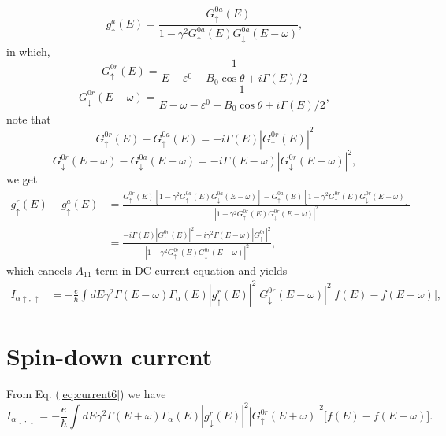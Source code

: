 \documentclass[11pt,a4paper]{article}
\begin{document}
\begin{equation}
g_{\uparrow}^{a}(E) = \frac{ G_{\uparrow}^{0a}(E)} {1-\gamma^{2} G_{\uparrow}^{0a}(E) G_{\downarrow}^{0a}(E-\omega)},
\end{equation}
in which,
\begin{equation}
G_{\uparrow}^{0 r}(E)=\frac{1}{E-\varepsilon^{0}-B_{0} \cos \theta+i \Gamma(E) / 2}
\end{equation}
\begin{equation}
G_{\downarrow}^{0 r}(E-\omega)=\frac{1}{E-\omega-\varepsilon^{0}+B_{0} \cos \theta+i \Gamma(E) / 2},
\end{equation}
note that
\begin{equation}
G_{\uparrow}^{0 r}(E) - G_{\uparrow}^{0 a}(E)=-i\Gamma(E) |G_{\uparrow}^{0 r}(E)|^{2}
\end{equation}
\begin{equation}
G_{\downarrow}^{0 r}(E-\omega) - G_{\downarrow}^{0 a}(E-\omega)=-i\Gamma(E-\omega) |G_{\downarrow}^{0 r}(E-\omega)|^{2},
\end{equation}
we get
\begin{equation}
\begin{split}
g_{\uparrow}^{r}(E) - g_{\uparrow}^{a}(E) &= \frac{G_{\uparrow}^{0r}(E)[1-\gamma^{2} G_{\uparrow}^{0a}(E) G_{\downarrow}^{0a}(E-\omega)]- G_{\uparrow}^{0a}(E)[1-\gamma^{2} G_{\uparrow}^{0r}(E) G_{\downarrow}^{0r}(E-\omega)]} {|1-\gamma^{2} G_{\uparrow}^{0r}(E) G_{\downarrow}^{0r}(E-\omega)|^{2}} \\
&=\frac{-i\Gamma(E) |G_{\uparrow}^{0 r}(E)|^{2}-i\gamma^{2}\Gamma(E-\omega) |G_{\uparrow}^{0r}|^{2}} {|1-\gamma^{2} G_{\uparrow}^{0r}(E) G_{\downarrow}^{0r}(E-\omega)|^{2}},
\end{split}
\end{equation}
which cancels $A_{11}$ term in DC current equation and yields
\begin{equation}
\begin{split}
I_{\alpha\uparrow,\uparrow}&=-\frac{e}{\hbar}\int dE \gamma^{2}\Gamma(E-\omega) \Gamma_{\alpha}(E)|g_{\uparrow}^{r}\left(E\right)|^{2} |G_{\downarrow}^{0r} (E-\omega)|^{2} \big[f(E) - f(E-\omega) \big],
\end{split}
\label{eq:current6}
\end{equation}
\section{Spin-down current}
From Eq. (\ref{eq:current6}) we have
\begin{equation}
I_{\alpha\downarrow,\downarrow}= -\frac{e}{\hbar}\int dE \gamma^{2}\Gamma(E+\omega) \Gamma_{\alpha}(E)|g_{\downarrow}^{r}\left(E\right)|^{2} |G_{\uparrow}^{0r} (E+\omega)|^{2} \big[f(E) - f(E+\omega) \big].
\label{eq:current7}
\end{equation}
\end{document}
